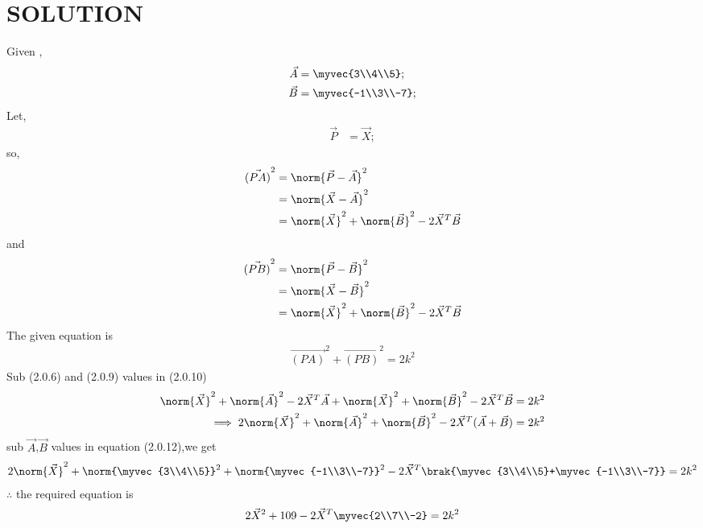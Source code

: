 \documentclass[journal,12pt,twocolumn]{IEEEtran}
\begin{document}
\section{SOLUTION} 
Given ,
\begin{align}
\vec A &=\myvec{3\\4\\5};
  \\
  \vec B &=\myvec{-1\\3\\-7};
\end{align}
Let,
\begin{align}
 \vec P &=\vec{X};
\end{align}
 so,
 \begin{align}
 \vec{(PA)}^2&=\norm{\vec P-\vec A}^2\\
 &=\norm{\vec X-\vec A}^2\\
 &=\norm{\vec X}^2+\norm{\vec B}^2-2\vec X^T\vec B
 \end{align}
 and
 \begin{align}
 \vec{(PB)}^2&=\norm{\vec P-\vec B}^2\\
 &=\norm{\vec X-\vec B}^2\\
 &=\norm{\vec X}^2+\norm{\vec B}^2-2\vec X^T\vec B
 \end{align}
 The given equation is
\begin{align}
 \vec{(PA)}^2+ \vec{(PB)}^2 =2k^2
 \end{align}
 Sub (2.0.6) and (2.0.9) values in (2.0.10)
\begin{align}
\norm{\vec X}^2+\norm{\vec A}^2-2\vec X^T\vec A+\norm{\vec X}^2+\norm{\vec B}^2-2\vec X^T\vec B=2k^2\\
\implies 2\norm{\vec X}^2+\norm{\vec A}^2+\norm{\vec B}^2-2\vec X^T(\vec A+\vec B)=2k^2
\end{align}
sub $\vec A$,$\vec B$ values in equation (2.0.12),we get
\begin{align}
 2\norm{\vec X}^2+\norm{\myvec{3\\4\\5}}^2+\norm{\myvec{-1\\3\\-7}}^2-2\vec X^T\brak{\myvec{3\\4\\5}+\myvec{-1\\3\\-7}}=2k^2
 \end{align}
 $\therefore$ the required equation is
 \begin{align}
  2\vec X^2+109-2\vec X^T\myvec{2\\7\\-2}=2k^2
\end{align}
\end{document}
